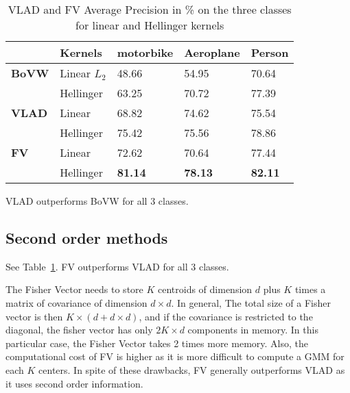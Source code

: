 \documentclass{article}
\begin{document}

\begin{table}[H]
\centering
\begin{tabular}{@{}|l|llll|@{}}
\toprule
\textbf{} & \textbf{Kernels} & \textbf{motorbike} & \textbf{Aeroplane} & \textbf{Person} \\ \midrule
\textbf{BoVW} & Linear $L_2$ & 48.66 & 54.95 & 70.64 \\
 & Hellinger & 63.25 & 70.72 & 77.39 \\ \midrule
\textbf{VLAD} & Linear & 68.82 & 74.62 & 75.54 \\
 & Hellinger & 75.42 & 75.56 & 78.86 \\ \midrule
\textbf{FV} & Linear & 72.62 & 70.64 & 77.44 \\
 & Hellinger & \textbf{81.14} & \textbf{78.13} & \textbf{82.11} \\ \bottomrule
\end{tabular}
\caption{VLAD and FV Average Precision in \% on the three classes for linear and Hellinger kernels}
\label{table:H_comparison}
\end{table}

VLAD outperforms BoVW for all 3 classes.

\subsection{Second order methods}

See Table~\ref{table:H_comparison}. FV outperforms VLAD for all 3 classes.

 The Fisher Vector needs to store $K$ centroids of dimension $d$ plus $K$ times a matrix of covariance of dimension $d \times d$. In general, The total size of a Fisher vector is then $K \times (d + d \times d)$, and if the covariance is restricted to the diagonal, the fisher vector has only $2K \times d$ components in memory. In this particular case, the Fisher Vector takes 2 times more memory. Also, the computational cost of FV is higher as it is more difficult to compute a GMM for each $K$ centers. In spite of these drawbacks, FV generally outperforms VLAD as it uses second order information.
\end{document}
